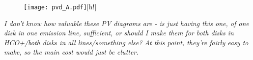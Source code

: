 \begin{figure}
  \centering
  \texttt{[image: pvd\_A.pdf]}[h!]
    \label{fig:pv_diag}
\end{figure}



\textit{I don't know how valuable these PV diagrams are - is just having this one, of one disk in one emission line, sufficient, or should I make them for both disks in HCO+/both disks in all lines/something else? At this point, they're fairly easy to make, so the main cost would just be clutter.}







